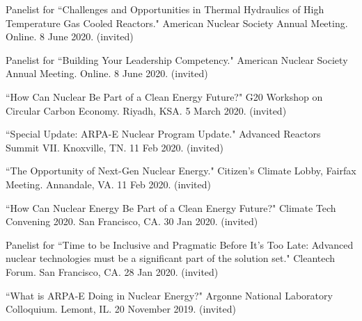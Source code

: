 \begin{bibsection}

\item Panelist for ``Challenges and Opportunities in Thermal
Hydraulics of High Temperature Gas Cooled Reactors." American Nuclear Society Annual Meeting. Online. 8 June 2020. (invited)

\item Panelist for ``Building Your Leadership Competency."
American Nuclear Society Annual Meeting. Online. 8 June 2020. (invited)


\item ``How Can Nuclear Be Part of a Clean Energy Future?" G20
Workshop on Circular Carbon Economy. Riyadh, KSA. 5 March 2020. (invited)

\item ``Special Update: ARPA-E Nuclear Program Update." Advanced Reactors Summit VII. Knoxville, TN. 11 Feb 2020.
(invited)

\item ``The Opportunity of Next-Gen Nuclear Energy." Citizen's Climate Lobby, Fairfax Meeting. Annandale, VA. 11 Feb 2020. (invited)


\item ``How Can Nuclear Energy Be Part of a Clean Energy Future?" Climate Tech Convening 2020. San Francisco, CA. 30 Jan 2020.
(invited)

\item Panelist for ``Time to be Inclusive and Pragmatic Before It’s Too Late: Advanced nuclear technologies must be a significant part of the solution set." Cleantech Forum. San Francisco, CA. 28 Jan 2020.
(invited)

\item ``What is ARPA-E Doing in Nuclear Energy?" Argonne National
Laboratory Colloquium. Lemont, IL. 20 November 2019. (invited)



\end{bibsection}
